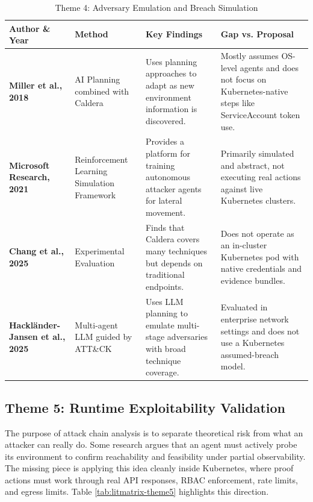 \documentclass[conference]{IEEEtran}
\begin{document}
\begin{table}[t!]
\centering
\caption{Theme 4: Adversary Emulation and Breach Simulation}
\label{tab:litmatrix-theme4}
\scriptsize
\setlength{\tabcolsep}{5pt}
\renewcommand{\arraystretch}{1.3}
\begin{tabularx}{\textwidth}{l p{2.6cm} X X}
\toprule
\textbf{Author \& Year} & \textbf{Method} & \textbf{Key Findings} & \textbf{Gap vs. Proposal} \\
\midrule
\textbf{Miller et al., 2018} \cite{miller2021automated} & AI Planning combined with Caldera & Uses planning approaches to adapt as new environment information is discovered. & Mostly assumes OS-level agents and does not focus on Kubernetes-native steps like ServiceAccount token use. \\
\addlinespace
\textbf{Microsoft Research, 2021} \cite{microsoft2021cyberbattlesim} & Reinforcement Learning Simulation Framework & Provides a platform for training autonomous attacker agents for lateral movement. & Primarily simulated and abstract, not executing real actions against live Kubernetes clusters. \\
\addlinespace
\textbf{Chang et al., 2025} \cite{applebaum2022characterizing} & Experimental Evaluation & Finds that Caldera covers many techniques but depends on traditional endpoints. & Does not operate as an in-cluster Kubernetes pod with native credentials and evidence bundles. \\
\addlinespace
\textbf{Hackl{\"a}nder-Jansen et al., 2025} \cite{lam2025autonomous} & Multi-agent LLM guided by ATT\&CK & Uses LLM planning to emulate multi-stage adversaries with broad technique coverage. & Evaluated in enterprise network settings and does not use a Kubernetes assumed-breach model. \\
\bottomrule
\end{tabularx}
\end{table}

\subsection{Theme 5: Runtime Exploitability Validation}
The purpose of attack chain analysis is to separate theoretical risk from what an attacker can really do. Some research argues that an agent must actively probe its environment to confirm reachability and feasibility under partial observability. The missing piece is applying this idea cleanly inside Kubernetes, where proof actions must work through real API responses, RBAC enforcement, rate limits, and egress limits. Table \ref{tab:litmatrix-theme5} highlights this direction.
\end{document}
